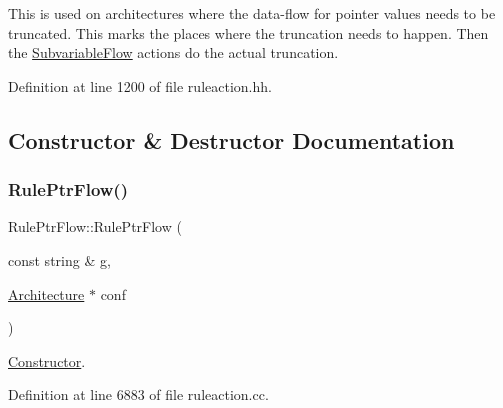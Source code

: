 This is used on architectures where the data-\/flow for pointer values needs to be truncated. This marks the places where the truncation needs to happen. Then the \mbox{\hyperlink{class_subvariable_flow}{Subvariable\+Flow}} actions do the actual truncation. 

Definition at line 1200 of file ruleaction.\+hh.



\subsection{Constructor \& Destructor Documentation}
\mbox{\label{class_rule_ptr_flow_a30a05dd13b867b4d8e99358a13969626}} 
\subsubsection{\texorpdfstring{RulePtrFlow()}{RulePtrFlow()}}
{\footnotesize\ttfamily Rule\+Ptr\+Flow\+::\+Rule\+Ptr\+Flow (\begin{DoxyParamCaption}\item[{const string \&}]{g,  }\item[{\mbox{\hyperlink{class_architecture}{Architecture}} $\ast$}]{conf }\end{DoxyParamCaption})}



\mbox{\hyperlink{class_constructor}{Constructor}}. 



Definition at line 6883 of file ruleaction.\+cc.


